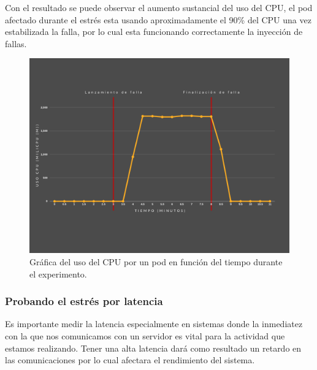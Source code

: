 \par Con el resultado se puede observar el aumento sustancial del uso del CPU, el pod afectado durante el estrés esta usando aproximadamente el 90\% del CPU una vez estabilizada la falla, por lo cual esta funcionando correctamente la inyección de fallas.\\

\begin{figure}[htpb!]
	\centering
	\includegraphics[width=0.95\columnwidth]{images/graficaspruebas/usocpu.png}
	\caption{Gráfica del uso del CPU por un pod en función del tiempo durante el experimento.}
	\label{fig:usocpu01}
\end{figure}

\subsubsection{Probando el estrés por latencia}


\par Es importante medir la latencia especialmente en sistemas donde la inmediatez con la que nos comunicamos con un servidor es vital para la actividad que estamos realizando. Tener una alta latencia dará como resultado un retardo en las comunicaciones por lo cual afectara el rendimiento del sistema.\\


